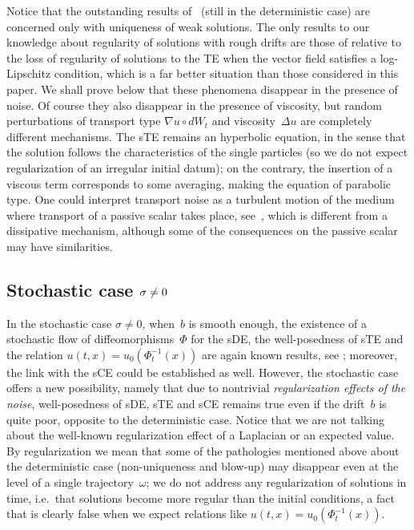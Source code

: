 \documentclass[a4paper,10pt]{article}
\newcommand\1{\mathbbm{1}}
\numberwithin{equation}{section}
\begin{document}
Notice that the outstanding results of~\cite{DIPELI89,AMBROSIO04} (still in the deterministic case) are concerned only with uniqueness of weak solutions. The only results to our knowledge about regularity of solutions with rough drifts are those of \cite[Section~3.3]{BAHCHEDAN11} relative to the loss of regularity of solutions to the TE when the vector field satisfies a log-Lipschitz condition, which is a far better situation than those considered in this paper. We shall prove below that these phenomena disappear in the presence of noise. Of course they also disappear in the presence of viscosity, but random perturbations of transport type $\nabla u\circ dW_{t}$ and viscosity~$\Delta u$ are completely different mechanisms. The sTE remains an hyperbolic equation, in the sense that the solution follows the characteristics of the single particles (so we do not expect regularization of an irregular initial datum); on the contrary, the insertion of a viscous term corresponds to some averaging, making the equation of parabolic type. One could interpret transport noise as a turbulent motion of the medium where transport of a
passive scalar takes place, see~\cite{CHAGAWHORKUPVER03}, which is different from a dissipative mechanism, although some of the consequences on the passive scalar may have similarities.

\subsection{Stochastic case $\protect\sigma\neq0$}

In the stochastic case $\sigma\neq0$, when~$b$ is smooth enough, the existence of a stochastic flow of diffeomorphisms~$\Phi$ for the sDE, the well-posedness of sTE and the relation $u(t,x) =u_{0}(\Phi_{t}^{-1}(x) )$ are again known results, see \cite{KUNITA84a,KUNITA84,KUNITA90}; moreover, the link with the sCE could be established as well. However, the stochastic case offers a new possibility, namely that due to nontrivial \emph{regularization effects of the noise}, well-posedness of sDE, sTE and sCE remains true even if the drift~$b$ is quite poor, opposite to the deterministic case. Notice that we are not talking about the well-known regularization effect of a Laplacian or an expected value. By regularization we mean that some of the pathologies mentioned above about the deterministic case (non-uniqueness and blow-up) may disappear even at the level of a single trajectory~$\omega$; we do not address any regularization of solutions in time, i.e.~that solutions become more regular than the initial conditions, a fact that is clearly false when we expect relations like $u(t,x) =u_{0}(\Phi_{t}^{-1}(x))$. 
\end{document}
